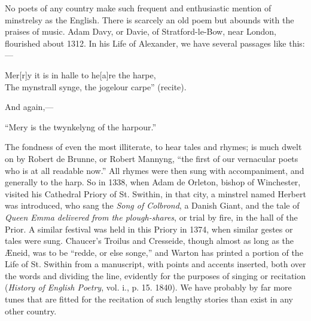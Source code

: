 No poets of any country make such frequent and enthusiastic mention of minstrelsy
as the English. There is scarcely an old poem but abounds with the
praises of music. Adam Davy, or Davie, of Stratford-le-Bow, near London,
flourished about 1312. In his Life of Alexander, we have several passages like
this:—
\settowidth{\versewidth}{The mynstrall synge, the jogelour carpe” (recite).}
\begin{scverse}
Mer[r]y it is in halle to he[a]re the harpe,\\
The mynstrall synge, the jogelour carpe” (recite).
\end{scverse}
And again,—
\settowidth{\versewidth}{“Mery is the twynkelyng of the harpour.”}
\begin{scverse}
“Mery is the twynkelyng of the harpour.”
\end{scverse}
The fondness of even the most illiterate, to hear tales and rhymes; is much
dwelt on by Robert de Brunne, or Robert Mannyng, “the first of our vernacular
poets who is at all readable now.” All rhymes were then sung with accompaniment, 
and generally to the harp. So in 1338, when Adam de Orleton, bishop of
Winchester, visited his Cathedral Priory of St. Swithin, in that city, a minstrel
named Herbert was introduced, who sang the \textit{Song of Colbrond}, a Danish Giant,
and the tale of \textit{Queen Emma delivered from the plough-shares}, or trial by fire, in
the hall of the Prior. A similar festival was held in this Priory in 1374, when
similar gestes or tales were sung. Chaucer’s Troilus and Cresseide, though almost
as long as the Æneid, was to be “redde, or else songe,” and Warton has printed
a portion of the Life of St. Swithin from a manuscript, with points and accents
inserted, both over the words and dividing the line, evidently for the purposes of
singing or recitation (\textit{History of English Poetry}, vol. i., p. 15. 1840). We have
probably by far more tunes that are fitted for the recitation of such lengthy stories
than exist in any other country.

